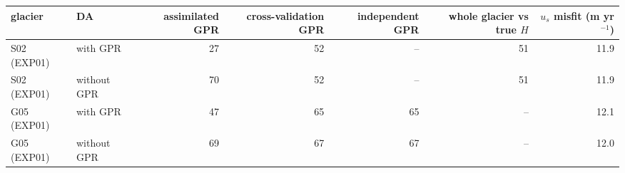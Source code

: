 \begin{tabular}{llrrrrr}
\toprule
glacier & DA & assimilated GPR & cross-validation GPR & independent GPR & whole glacier vs true $H$ & $u_s$ misfit (m yr$^{-1}$) \\
\midrule
S02 (EXP01) & with GPR & 27 & 52 & -- & 51 & 11.9 \\
S02 (EXP01) & without GPR & 70 & 52 & -- & 51 & 11.9 \\
G05 (EXP01) & with GPR & 47 & 65 & 65 & -- & 12.1 \\
G05 (EXP01) & without GPR & 69 & 67 & 67 & -- & 12.0 \\
\bottomrule
\end{tabular}
